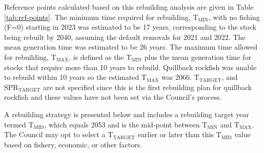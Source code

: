 \documentclass[11pt,
  english,
  letterpaper,
]{article}
\begin{document}
Reference points calculated based on this rebuilding analysis are given in Table \ref{tab:ref-points}. The minimum time required for rebuilding, {\(\text{T}_\text{MIN}\)\leavevmode\tagmcend\tagstructend}, with no fishing (F=0) starting in 2023 was estimated to be 17 years, corresponding to the stock being rebuilt by 2040, assuming the default removals for 2021 and 2022. The mean generation time was estimated to be 26 years. The maximum time allowed for rebuilding, {\(\text{T}_\text{MAX}\)\leavevmode\tagmcend\tagstructend}, is defined as the {\(\text{T}_\text{MIN}\)\leavevmode\tagmcend\tagstructend} plus the mean generation time for stocks that require more than 10 years to rebuild. Quillback rockfish was unable to rebuild within 10 years so the estimated {\(\text{T}_\text{MAX}\)\leavevmode\tagmcend\tagstructend} was 2066. {\(\text{T}_\text{TARGET}\)\leavevmode\tagmcend\tagstructend}, and {\(\text{SPR}_\text{TARGET}\)\leavevmode\tagmcend\tagstructend} are not specified since this is the first rebuilding plan for quillback rockfish and these values have not been set via the Council's process.

\leavevmode\tagmcend\tagstructend\par


A rebuilding strategy is presented below and includes a rebuilding target year termed {\(\text{T}_\text{MID}\)\leavevmode\tagmcend\tagstructend}, which equals 2053 and is the mid-point between {\(\text{T}_\text{MIN}\)\leavevmode\tagmcend\tagstructend} and {\(\text{T}_\text{MAX}\)\leavevmode\tagmcend\tagstructend}. The Council may opt to select a {\(\text{T}_\text{TARGET}\)\leavevmode\tagmcend\tagstructend} earlier or later than this {\(\text{T}_\text{MID}\)\leavevmode\tagmcend\tagstructend} value based on fishery, economic, or other factors.

\leavevmode\tagmcend\tagstructend\par
\end{document}

